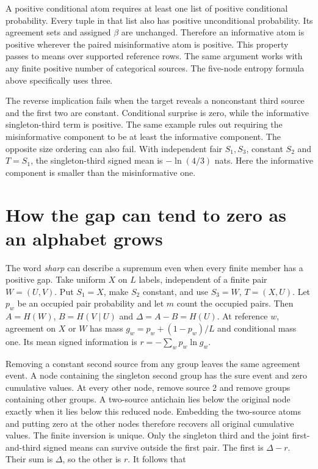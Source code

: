 A positive conditional atom requires at least one list of positive conditional probability. Every tuple in that list also has positive unconditional probability. Its agreement sets and assigned \(\beta\) are unchanged. Therefore an informative atom is positive wherever the paired misinformative atom is positive. This property passes to means over supported reference rows. The same argument works with any finite positive number of categorical sources. The five-node entropy formula above specifically uses three.

The reverse implication fails when the target reveals a nonconstant third source and the first two are constant. Conditional surprise is zero, while the informative singleton-third term is positive. The same example rules out requiring the misinformative component to be at least the informative component. The opposite size ordering can also fail. With independent fair \(S_1,S_3\), constant \(S_2\) and \(T=S_1\), the singleton-third signed mean is \(-\ln(4/3)\) nats. Here the informative component is smaller than the misinformative one.

\clearpage

\section{How the gap can tend to zero as an alphabet grows}\label{how-the-gap-can-tend-to-zero-as-an-alphabet-grows}

The word \emph{sharp} can describe a supremum even when every finite member has a positive gap. Take uniform \(X\) on \(L\) labels, independent of a finite pair \(W=(U,V)\). Put \(S_1=X\), make \(S_2\) constant, and use \(S_3=W\), \(T=(X,U)\). Let \(p_w\) be an occupied pair probability and let \(m\) count the occupied pairs. Then \(A=H(W)\), \(B=H(V\mid U)\) and \(\Delta=A-B=H(U)\). At reference \(w\), agreement on \(X\) or \(W\) has mass \(g_w=p_w+(1-p_w)/L\) and conditional mass one. Its mean signed information is \(r=-\sum_w p_w\ln g_w\).

Removing a constant second source from any group leaves the same agreement event. A node containing the singleton second group has the sure event and zero cumulative values. At every other node, remove source 2 and remove groups containing other groups. A two-source antichain lies below the original node exactly when it lies below this reduced node. Embedding the two-source atoms and putting zero at the other nodes therefore recovers all original cumulative values. The finite inversion is unique. Only the singleton third and the joint first-and-third signed means can survive outside the first pair. The first is \(\Delta-r\). Their sum is \(\Delta\), so the other is \(r\). It follows that

